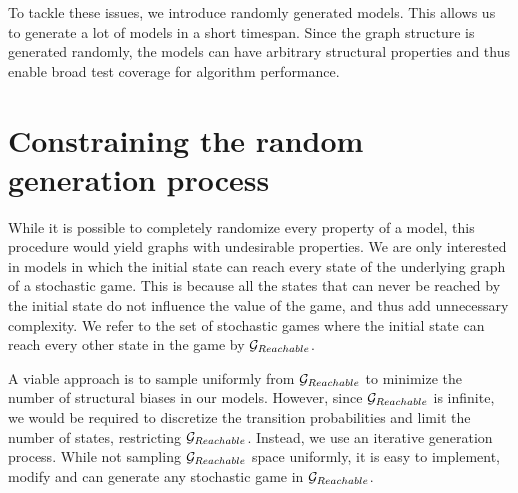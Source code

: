 To tackle these issues, we introduce randomly generated models. 
This allows us to generate a lot of models in a short timespan.
Since the graph structure is generated randomly, 
the models can have arbitrary structural properties and thus enable broad test coverage for algorithm performance.



\section{Constraining the random generation process}
While it is possible to completely randomize every property of a model, this procedure would yield graphs with undesirable properties. 
We are only interested in models in which the initial state can reach every state of the underlying graph of a stochastic game. 
This is because all the states that can never be reached by the initial state do not influence the value of the game, and thus add unnecessary complexity.
We refer to the set of stochastic games where the initial state can reach every other state in the game by $\mathcal{G}_{Reachable}$.

A viable approach is to sample uniformly from $\mathcal{G}_{Reachable}$ to minimize the number of structural biases in our models.
However, since $\mathcal{G}_{Reachable}$ is infinite, we would be required to discretize the transition probabilities and limit the number of states,
restricting $\mathcal{G}_{Reachable}$.
Instead, we use an iterative generation process.
While not sampling $\mathcal{G}_{Reachable}$ space uniformly, it is easy to implement, modify and can generate any stochastic game in $\mathcal{G}_{Reachable}$.

